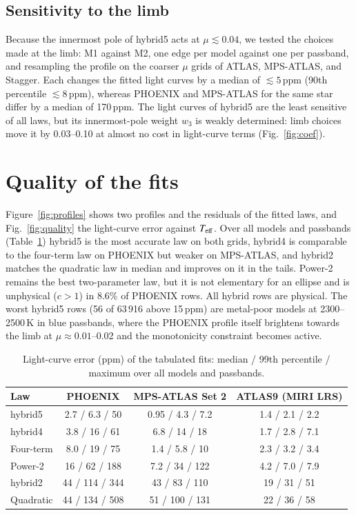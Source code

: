 \documentclass{aa}
\newcommand{\ppm}{\,\textrm{ppm}}
\newcommand{\teff}{T_{\rm eff}}
\begin{document}
\subsection{Sensitivity to the limb}
Because the innermost pole of hybrid5 acts at $\mu\lesssim0.04$, we tested the
choices made at the limb: M1 against M2, one edge per model against one per
passband, and resampling the profile on the coarser $\mu$ grids of ATLAS,
MPS-ATLAS, and Stagger. Each changes the fitted light curves by a median of
$\lesssim5\ppm$ (90th percentile $\lesssim8\ppm$), whereas PHOENIX and MPS-ATLAS
for the same star differ by a median of 170\ppm. The light curves of hybrid5
are the least sensitive of all laws, but its innermost-pole weight $w_3$ is
weakly determined: limb choices move it by 0.03--0.10 at almost no cost in
light-curve terms (Fig.~\ref{fig:coef}).

\section{Quality of the fits}\label{sec:quality}
Figure~\ref{fig:profiles} shows two profiles and the residuals of the fitted
laws, and Fig.~\ref{fig:quality} the light-curve error against $\teff$. Over all
models and passbands (Table~\ref{tab:quality}) hybrid5 is the most accurate law
on both grids, hybrid4 is comparable to the four-term law on PHOENIX but weaker
on MPS-ATLAS, and hybrid2 matches the quadratic law in median and improves on it
in the tails. Power-2 remains the best two-parameter law, but it is not
elementary for an ellipse and is unphysical ($c>1$) in 8.6\% of PHOENIX rows.
All hybrid rows are physical. The worst hybrid5 rows (56 of 63\,916 above
15\ppm) are metal-poor models at 2300--2500\,K in blue passbands, where the
PHOENIX profile itself brightens towards the limb at $\mu\approx0.01$--0.02 and
the monotonicity constraint becomes active.

\begin{table}
\caption{Light-curve error (ppm) of the tabulated fits: median / 99th
percentile / maximum over all models and passbands.}
\label{tab:quality}
\centering
\begin{tabular}{lccc}
\hline\hline
Law & PHOENIX & MPS-ATLAS Set 2 & ATLAS9 (MIRI LRS)\\
\hline
hybrid5 & 2.7 / 6.3 / 50 & 0.95 / 4.3 / 7.2 & 1.4 / 2.1 / 2.2\\
hybrid4 & 3.8 / 16 / 61 & 6.8 / 14 / 18 & 1.7 / 2.8 / 7.1\\
Four-term & 8.0 / 19 / 75 & 1.4 / 5.8 / 10 & 2.3 / 3.2 / 3.4\\
Power-2 & 16 / 62 / 188 & 7.2 / 34 / 122 & 4.2 / 7.0 / 7.9\\
hybrid2 & 44 / 114 / 344 & 43 / 83 / 110 & 19 / 31 / 51\\
Quadratic & 44 / 134 / 508 & 51 / 100 / 131 & 22 / 36 / 58\\
\hline
\end{tabular}
\end{table}
\end{document}
